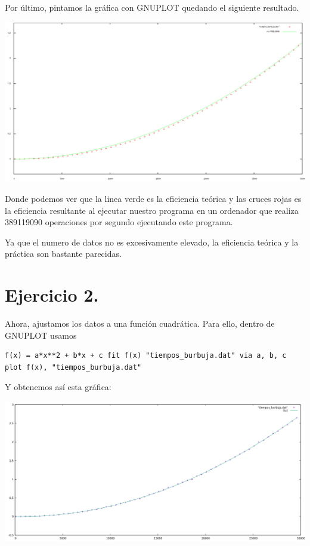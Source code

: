 \documentclass[11pt]{article}
\begin{document}
Por último, pintamos la gráfica con GNUPLOT quedando el siguiente
resultado.


\includegraphics[scale=0.25]{grafica1.png}

Donde podemos ver que la linea verde es la eficiencia teórica y las
cruces rojas es la eficiencia resultante al ejecutar nuestro programa
en un ordenador que realiza 389119090 operaciones por segundo
ejecutando este programa.

Ya que el numero de datos no es excesivamente elevado, la eficiencia
teórica y la práctica son bastante parecidas.


\section*{Ejercicio 2.}
\label{sec-2}

Ahora, ajustamos los datos a una función cuadrática. Para ello, dentro
de GNUPLOT usamos

\begin{verbatim}
f(x) = a*x**2 + b*x + c fit f(x) "tiempos_burbuja.dat" via a, b, c
plot f(x), "tiempos_burbuja.dat"
\end{verbatim}

Y obtenemos así esta gráfica:


\includegraphics[scale=0.5]{Grafica2.png}
\end{document}
